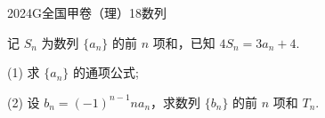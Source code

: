 
\begin{problem}{2024}{G}{全国甲卷（理）}{18}{数列}

记 $S_n$ 为数列 $\{a_n\}$ 的前 $n$ 项和，已知 $4S_n=3a_n+4$.

(1) 求 $\{a_n\}$ 的通项公式;

(2) 设 $b_n=(-1)^{n-1} n a_n$，求数列 $\{b_n\}$ 的前 $n$ 项和 $T_n$.


\end{problem}